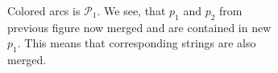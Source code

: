 \documentclass[11pt]{article}
\begin{document}
\begin{figure}[h]
\begin{subfigure}[t]{0.3\textwidth}
			\caption{Colored arcs is $\mathcal{P}_1$. We see, that $p_1$ and $p_2$ from previous figure now merged and are contained in new $p_1$. This means that corresponding strings are also merged.}
			\label{fig:1c}
		\end{subfigure}
	\caption{}
	\end{figure}
	
\end{document}
